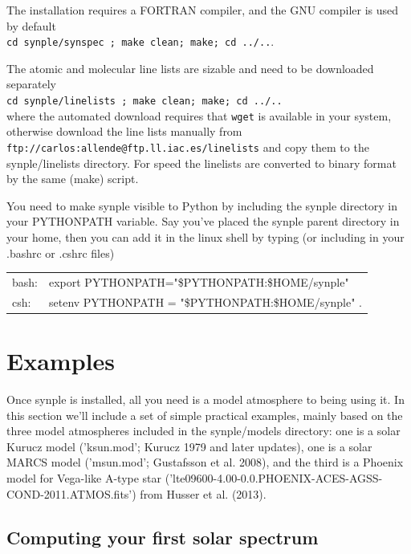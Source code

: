 \documentclass[]{article}
\begin{document}
The installation requires a FORTRAN compiler, and the GNU compiler is used by default
\\ {\tt cd synple/synspec ; make clean; make; cd ../..}.

The atomic and molecular line lists are sizable and need to be downloaded separately
\\ {\tt cd synple/linelists ; make clean; make; cd ../..} \\
\noindent where the automated download requires that {\tt wget} is available in your system, otherwise download the line lists manually from \\ {\tt ftp://carlos:allende@ftp.ll.iac.es/linelists} and copy them to the synple/linelists directory. For speed the linelists are converted to binary format by the same (make) script.

You need to make synple visible to Python by including the synple directory in your PYTHONPATH variable. Say you've placed the synple parent directory in your home, then you can add it in the linux shell by typing (or including in your .bashrc or .cshrc files)
\begin{table}[h]
\begin{tabular}{ll}
bash: & export PYTHONPATH="\$PYTHONPATH:\$HOME/synple"  \\
csh:  & setenv PYTHONPATH = "\$PYTHONPATH:\$HOME/synple" .
\end{tabular}
\end{table}


\section{Examples}

Once synple is installed, all you need is a model atmosphere to being using it. In this section we'll include a set of simple practical examples, mainly based on the three model atmospheres included in the synple/models directory: one is a solar Kurucz model ('ksun.mod'; Kurucz 1979 and later updates), one is a solar MARCS model ('msun.mod'; Gustafsson et al. 2008), and the third is a Phoenix model for Vega-like A-type star ('lte09600-4.00-0.0.PHOENIX-ACES-AGSS-COND-2011.ATMOS.fits') from Husser et al. (2013).


\subsection{Computing your first solar spectrum}
\label{6162}
\end{document}
